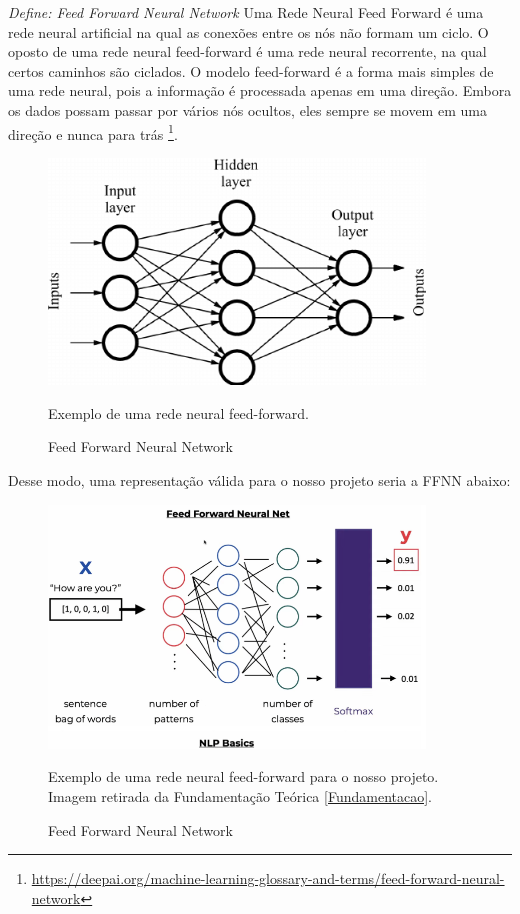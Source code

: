 \textit{Define: Feed Forward Neural Network} Uma Rede Neural Feed Forward é uma rede neural artificial na qual as conexões entre os nós não formam um ciclo. O oposto de uma rede neural feed-forward é uma rede neural recorrente, na qual certos caminhos são ciclados. O modelo feed-forward é a forma mais simples de uma rede neural, pois a informação é processada apenas em uma direção. Embora os dados possam passar por vários nós ocultos, eles sempre se movem em uma direção e nunca para trás \footnote{\url{https://deepai.org/machine-learning-glossary-and-terms/feed-forward-neural-network}}.


\begin{figure}[H]
   \begin{center}
      \includegraphics[width=10cm]{img/ffnn.png}
      \caption{Feed Forward Neural Network} \label{ffnn}
      \medskip
      \small
      Exemplo de uma rede neural feed-forward.
   \end{center}
\end{figure}

Desse modo, uma representação válida para o nosso projeto seria a FFNN abaixo:
\begin{figure}[H]
   \begin{center}
      \includegraphics[width=10cm]{img/ffnn2.png}
      \caption{Feed Forward Neural Network} \label{ffnn2}
      \medskip
      \small
      Exemplo de uma rede neural feed-forward para o nosso projeto. Imagem retirada da Fundamentação Teórica \ref{Fundamentacao}.
   \end{center}
\end{figure}
